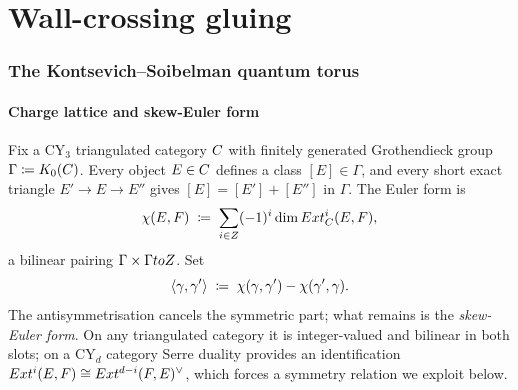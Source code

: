 %
%

\providecommand{\ClaimStatusTheorem}{\textsuperscript{\textsc{[thm]}}}
\providecommand{\ClaimStatusConjectured}{\textsuperscript{\textsc{[cj]}}}

\part{Wall-crossing gluing}
\label{part:gluing-wallcrossing}

\section{The Kontsevich--Soibelman quantum torus}
\label{sec:ks-quantum-torus}

\subsection{Charge lattice and skew-Euler form}

Fix a CY$_3$ triangulated category $C$ with finitely generated
Grothendieck group $\Gamma \coloneqq K_0(C)$. Every object $E \in C$
defines a class $[E] \in \Gamma$, and every short exact triangle
$E' \to E \to E''$ gives $[E] = [E'] + [E'']$ in $\Gamma$. The Euler
form is
\[
  \chi(E, F) \;\coloneqq\; \sum_{i \in Z} (-1)^i \dim Ext^i_{C}(E, F),
\]
a bilinear pairing $\Gamma \times \Gamma to Z$. Set
\[
  \langle \gamma, \gamma' \rangle \;\coloneqq\; \chi(\gamma, \gamma') - \chi(\gamma', \gamma).
\]
The antisymmetrisation cancels the symmetric part; what remains is the
\emph{skew-Euler form}. On any triangulated category it is integer-valued and
bilinear in both slots; on a CY$_d$ category Serre duality provides an
identification $Ext^i(E, F) \cong Ext^{d-i}(F, E)^\vee$, which forces a
symmetry relation we exploit below.

